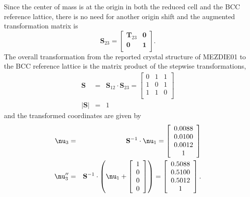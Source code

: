 \documentclass[preprint]{iucr}              %
\begin{document}
Since the center of mass is at the origin in both the reduced cell and the BCC reference lattice, there is no need for another origin shift and the augmented transformation matrix is
\begin{equation}
   \mathbf{S}_{23}=\left[
     \begin{array}{cc}
        \mathbf{T}_{23}& \mathbf{0}\\
        \mathbf{0}& \mathbf{1}\\
     \end{array}
  \right].
\end{equation}
The overall transformation from the reported crystal structure of MEZDIE01 to the BCC reference lattice is the matrix product of the stepwise transformations,
\begin{eqnarray}
   \mathbf{S}&=&\mathbf{S}_{12}\cdot\mathbf{S}_{23}=\left[
     \begin{array}{ccc}
        0& 1& 1\\
        1& 0& 1\\
        1& 1& 0\\
     \end{array}
  \right]\\
   \vert\mathbf{S}\vert&=&1
\end{eqnarray}
and the transformed coordinates are given by
\begin{eqnarray}
   \mbox{\boldmath$\nu$}_{3}&=&\mathbf{S}^{-1}\cdot
\mbox{\boldmath$\nu$}_{1}
=\left[
     \begin{array}{c}
        0.0088\\
        0.0100\\
        0.0012\\
	1\\
     \end{array}
  \right]\\
   \mbox{\boldmath$\nu$}_{3}^{\prime\prime}&=&\mathbf{S}^{-1}\cdot
\left(\mbox{\boldmath$\nu$}_{1}+\left[\begin{array}{c}1\\
0\\
0\\
0\end{array}\right]\right)=\left[
     \begin{array}{c}
        0.5088\\
        0.5100\\
        0.5012\\
	1\\
     \end{array}
  \right].
\end{eqnarray}
\end{document}
